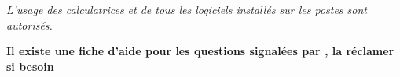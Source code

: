 \documentclass[12pt,french]{report}
\begin{document}
\thispagestyle{garde}
\medskip







\begin{center}
\begin{minipage}{0.9\linewidth}
\begin{center}
\itshape
L'usage des calculatrices et de tous les logiciels installés sur les postes sont autorisés.

\textbf{Il existe une fiche d'aide pour les questions signalées par \bcoutil, la réclamer si besoin }
\end{center}
\end{minipage}
\end{center}
\end{document}
